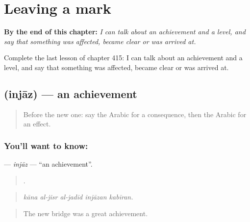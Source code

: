 
\chapter{Leaving a mark}
\label{ch:ar-leaving-a-mark}

\begin{chapteropening}
\textbf{By the end of this chapter:} \emph{I can talk about an achievement and a level, and say that something was affected, became clear or was arrived at.}

Complete the last lesson of chapter 415: I can talk about an achievement and a level, and say that something was affected, became clear or was arrived at.
\end{chapteropening}

\section[\texorpdfstring{\ar{إنجاز} (injāz)}{إنجاز (injāz)}]{ (injāz) — an achievement}

\label{lesson:AR-C415-injaz}



\begin{quote}
Before the new one: say the Arabic for a consequence, then the Arabic for an effect.
\end{quote}

\subsection*{You'll want to know: }
\textbf{} — \emph{injāz} — \textquotedblleft{}an achievement\textquotedblright{}.

\begin{quote}
    .
\end{quote}

\begin{quote}
\emph{kāna al-jisr al-jadīd injāzan kabīran.}
\end{quote}

\begin{quote}
The new bridge was a great achievement.
\end{quote}

